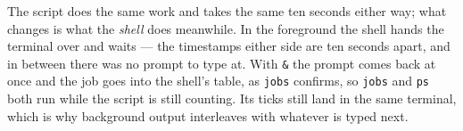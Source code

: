 
The script does the same work and takes the same ten seconds either way; what
changes is what the \emph{shell} does meanwhile. In the foreground the shell
hands the terminal over and waits --- the timestamps either side are ten seconds
apart, and in between there was no prompt to type at. With \texttt{\&} the
prompt comes back at once and the job goes into the shell's table, as
\texttt{jobs} confirms, so \texttt{jobs} and \texttt{ps} both run while the
script is still counting. Its ticks still land in the same terminal, which is
why background output interleaves with whatever is typed next.

